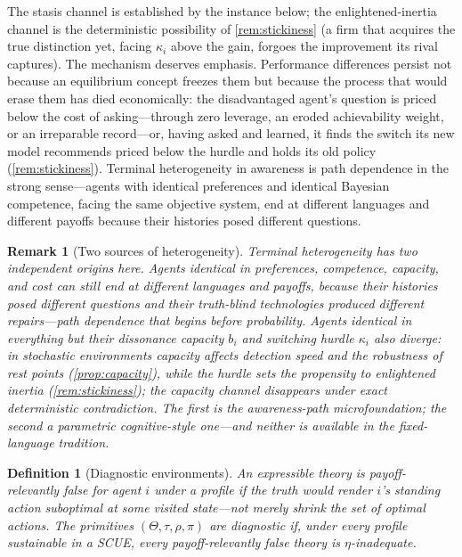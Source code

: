 \documentclass[11pt]{article}
\newtheorem{definition}[assumption]{Definition}
\newtheorem{remark}[assumption]{Remark}
\theoremstyle{definition}
\begin{document}
The stasis channel is established by the instance below; the enlightened-inertia channel is the deterministic possibility of \cref{rem:stickiness} (a firm that acquires the true distinction yet, facing $\kappa_i$ above the gain, forgoes the improvement its rival captures). The mechanism deserves emphasis.
Performance differences persist not because an equilibrium concept freezes them but because the process that would erase them has died economically: the disadvantaged agent's question is priced below the cost of asking---through zero leverage, an eroded achievability weight, or an irreparable record---or, having asked and learned, it finds the switch its new model recommends priced below the hurdle and holds its old policy (\cref{rem:stickiness}).
Terminal heterogeneity in awareness is path dependence in the strong sense---agents with identical preferences and identical Bayesian competence, facing the same objective system, end at different languages and different payoffs because their histories posed different questions.

\begin{remark}[Two sources of heterogeneity]
\label{rem:two-sources}
Terminal heterogeneity has two independent origins here.
Agents identical in preferences, competence, capacity, and cost can still end at different languages and payoffs, because their histories posed different questions and their truth-blind technologies produced different repairs---path dependence that begins before probability.
Agents identical in \emph{everything} but their dissonance capacity $b_i$ and switching hurdle $\kappa_i$ also diverge: in stochastic environments capacity affects detection speed and the robustness of rest points (\cref{prop:capacity}), while the hurdle sets the propensity to enlightened inertia (\cref{rem:stickiness}); the capacity channel disappears under exact deterministic contradiction.
The first is the awareness-path microfoundation; the second a parametric cognitive-style one---and neither is available in the fixed-language tradition.
\end{remark}

\begin{definition}[Diagnostic environments]
\label{def:diagnostic}
An expressible theory is \emph{payoff-relevantly false} for agent $i$ under a profile if the truth would render $i$'s standing action suboptimal at some visited state---not merely shrink the set of optimal actions.
The primitives $(\Theta,\tau,\rho,\pi)$ are \emph{diagnostic} if, under every profile sustainable in a SCUE, every payoff-relevantly false theory is $\eta$-inadequate.
\end{definition}
\end{document}
